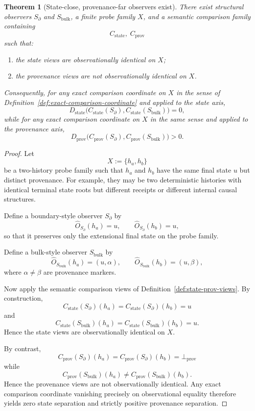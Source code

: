 \documentclass[11pt,twoside]{article}
\newtheorem{theorem}{Theorem}[section]
\theoremstyle{definition}
\newcommand{\bulk}{\mathrm{bulk}}
\begin{document}
\begin{theorem}[State-close, provenance-far observers exist]
\label{thm:state-close-prov-far}
There exist structural observers \(S_{\partial}\) and \(S_{\bulk}\), a finite probe family \(X\), and a semantic comparison family containing
\[
  C_{\mathrm{state}},\; C_{\mathrm{prov}}
\]
such that:
\begin{enumerate}[leftmargin=*]
  \item the state views are observationally identical on \(X\);
  \item the provenance views are not observationally identical on \(X\).
\end{enumerate}
Consequently, for any exact comparison coordinate on \(X\) in the sense of Definition~\ref{def:exact-comparison-coordinate} and applied to the state axis,
\[
  D_{\mathrm{state}}\!\bigl(C_{\mathrm{state}}(S_{\partial}),
  C_{\mathrm{state}}(S_{\bulk})\bigr)=0,
\]
while for any exact comparison coordinate on \(X\) in the same sense and applied to the provenance axis,
\[
  D_{\mathrm{prov}}\!\bigl(C_{\mathrm{prov}}(S_{\partial}),
  C_{\mathrm{prov}}(S_{\bulk})\bigr)>0.
\]
\end{theorem}

\begin{proof}
Let
\[
  X := \{ h_a, h_b \}
\]
be a two-history probe family such that \(h_a\) and \(h_b\) have the same final state \(u\) but distinct provenance. For example, they may be two deterministic histories with identical terminal state roots but different receipts or different internal causal structures.

Define a boundary-style observer \(S_{\partial}\) by
\[
  \widehat{O}_{S_{\partial}}(h_a)=u,
  \qquad
  \widehat{O}_{S_{\partial}}(h_b)=u,
\]
so that it preserves only the extensional final state on the probe family.

Define a bulk-style observer \(S_{\bulk}\) by
\[
  \widehat{O}_{S_{\bulk}}(h_a)=(u,\alpha),
  \qquad
  \widehat{O}_{S_{\bulk}}(h_b)=(u,\beta),
\]
where \(\alpha\neq\beta\) are provenance markers.

Now apply the semantic comparison views of Definition~\ref{def:state-prov-views}. By construction,
\[
  C_{\mathrm{state}}(S_{\partial})(h_a)
  =
  C_{\mathrm{state}}(S_{\partial})(h_b)
  =
  u
\]
and
\[
  C_{\mathrm{state}}(S_{\bulk})(h_a)
  =
  C_{\mathrm{state}}(S_{\bulk})(h_b)
  =
  u.
\]
Hence the state views are observationally identical on \(X\).

By contrast,
\[
  C_{\mathrm{prov}}(S_{\partial})(h_a)
  =
  C_{\mathrm{prov}}(S_{\partial})(h_b)
  =
  \bot_{\mathrm{prov}}
\]
while
\[
  C_{\mathrm{prov}}(S_{\bulk})(h_a)
  \neq
  C_{\mathrm{prov}}(S_{\bulk})(h_b).
\]
Hence the provenance views are not observationally identical. Any exact comparison coordinate vanishing precisely on observational equality therefore yields zero state separation and strictly positive provenance separation.
\end{proof}
\end{document}
